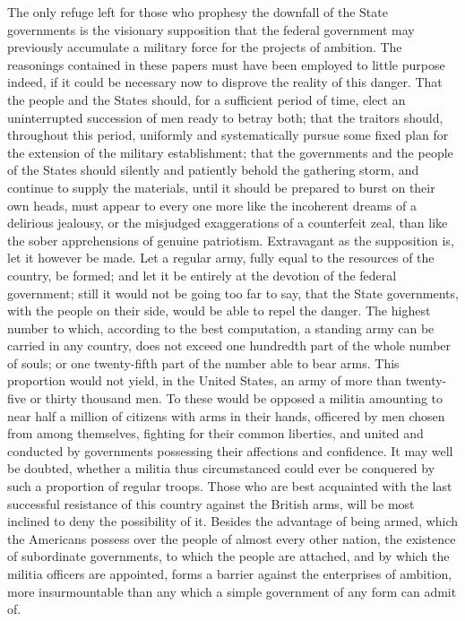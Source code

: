 The only refuge left for those who prophesy the downfall of the State governments is the visionary supposition that the federal government may previously accumulate a military force for the projects of ambition. 
The reasonings contained in these papers must have been employed to little purpose indeed, if it could be necessary now to disprove the reality of this danger. 
That the people and the States should, for a sufficient period of time, elect an uninterrupted succession of men ready to betray both; that the traitors should, throughout this period, uniformly and systematically pursue some fixed plan for the extension of the military establishment; that the governments and the people of the States should silently and patiently behold the gathering storm, and continue to supply the materials, until it should be prepared to burst on their own heads, must appear to every one more like the incoherent dreams of a delirious jealousy, or the misjudged exaggerations of a counterfeit zeal, than like the sober apprehensions of genuine patriotism. 
Extravagant as the supposition is, let it however be made. 
Let a regular army, fully equal to the resources of the country, be formed; and let it be entirely at the devotion of the federal government; still it would not be going too far to say, that the State governments, with the people on their side, would be able to repel the danger. 
The highest number to which, according to the best computation, a standing army can be carried in any country, does not exceed one hundredth part of the whole number of souls; or one twenty-fifth part of the number able to bear arms. 
This proportion would not yield, in the United States, an army of more than twenty-five or thirty thousand men. 
To these would be opposed a militia amounting to near half a million of citizens with arms in their hands, officered by men chosen from among themselves, fighting for their common liberties, and united and conducted by governments possessing their affections and confidence. 
It may well be doubted, whether a militia thus circumstanced could ever be conquered by such a proportion of regular troops. 
Those who are best acquainted with the last successful resistance of this country against the British arms, will be most inclined to deny the possibility of it. 
Besides the advantage of being armed, which the Americans possess over the people of almost every other nation, the existence of subordinate governments, to which the people are attached, and by which the militia officers are appointed, forms a barrier against the enterprises of ambition, more insurmountable than any which a simple government of any form can admit of. 
